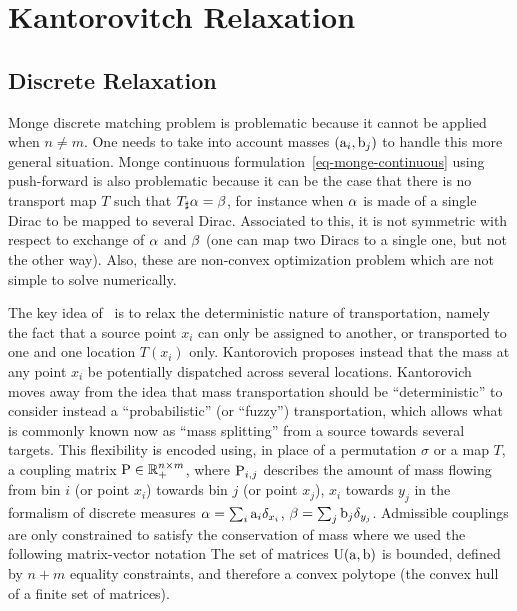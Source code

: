 
\section{Kantorovitch Relaxation}

\subsection{Discrete Relaxation}

Monge discrete matching problem is problematic because it cannot be applied when $n \neq m$. One needs to take into account masses $(\a_i,\b_j)$ to handle this more general situation. 
%
Monge continuous formulation~\eqref{eq-monge-continuous} using push-forward is also problematic because it can be the case that there is no transport map $T$ such that $T_\sharp \al = \be$, for instance when $\al$ is made of a single Dirac to be mapped to several Dirac. Associated to this, it is not symmetric with respect to exchange of $\al$ and $\be$ (one can map two Diracs to a single one, but not the other way).
%
Also, these are non-convex optimization problem which are not simple to solve numerically. 
 
The key idea of~\cite{Kantorovich42} is to relax the deterministic nature of transportation, namely the fact that a source point $x_i$ can only be assigned to another, or transported to one and one location $T(x_i)$ only. Kantorovich proposes instead that the mass at any point $x_i$ be potentially dispatched across several locations. Kantorovich moves away from the idea that mass transportation should be ``deterministic'' to consider instead a ``probabilistic'' (or ``fuzzy'') transportation, which allows what is commonly known now as ``mass splitting'' from a source towards several targets. This flexibility is encoded using, in place of a permutation $\sigma$ or a map $T$, a coupling matrix $\P  \in \RR_+^{n \times m}$, where $\P_{i,j}$ describes the amount of mass flowing from bin $i$ (or point $x_i$) towards bin $j$ (or point $x_j$), 
$x_i$ towards $y_j$ in the formalism of discrete measures $\al=\sum_i \a_i \de_{x_i}$, $\be=\sum_j \b_j \de_{y_j}$. Admissible couplings are only constrained to satisfy the conservation of mass
where we used the following matrix-vector notation
The set of matrices $\CouplingsD(\a,\b)$ is bounded, defined by $n+m$ equality constraints, and therefore a convex polytope (the convex hull of a finite set of matrices).

